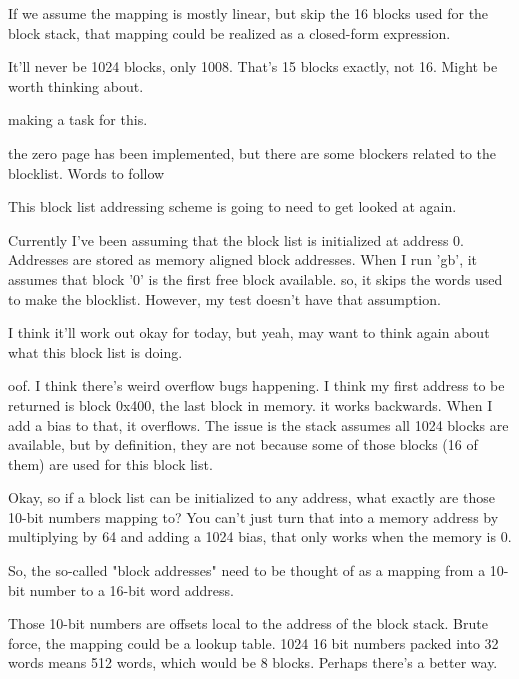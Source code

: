 If we assume the mapping is mostly linear, but skip the 16 blocks used for the block stack, that mapping could be realized as a closed-form expression.
\par

It'll never be 1024 blocks, only 1008. That's 15 blocks exactly, not 16. Might be worth thinking about.
\par

making a task for this.
\par

the zero page has been implemented, but there are some blockers related to the blocklist. Words to follow
\par

This block list addressing scheme is going to need to get looked at again.
\par

Currently I've been assuming that the block list is initialized at address 0. Addresses are stored as memory aligned block addresses. When I run 'gb', it assumes that block '0' is the first free block available. so, it skips the words used to make the blocklist. However, my test doesn't have that assumption.
\par

I think it'll work out okay for today, but yeah, may want to think again about what this block list is doing.
\par

oof. I think there's weird overflow bugs happening. I think my first address to be returned is block 0x400, the last block in memory. it works backwards. When I add a bias to that, it overflows. The issue is the stack assumes all 1024 blocks are available, but by definition, they are not because some of those blocks (16 of them) are used for this block list.
\par

Okay, so if a block list can be initialized to any address, what exactly are those 10-bit numbers mapping to? You can't just turn that into a memory address by multiplying by 64 and adding a 1024 bias, that only works when the memory is 0.
\par

So, the so-called "block addresses" need to be thought of as a mapping from a 10-bit number to a 16-bit word address.
\par

Those 10-bit numbers are offsets local to the address of the block stack. Brute force, the mapping could be a lookup table. 1024 16 bit numbers packed into 32 words means 512 words, which would be 8 blocks. Perhaps there's a better way.
\par

